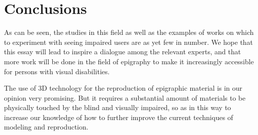 \documentclass[amsthm,ebook]{saparticle}
\begin{document}
\section{Conclusions}
\noindent As can be seen, the studies in this field as well as the examples of works on which to experiment with seeing impaired
users are as yet few in number. We hope that this essay will lead to inspire a dialogue among the relevant experts, and
that more work will be done in the field of epigraphy to make it increasingly accessible for persons with visual
disabilities.

The use of 3D technology for the reproduction of epigraphic material is in our opinion very promising. But it requires a
substantial amount of materials to be physically touched by the blind and visually impaired, so as in this way to
increase our knowledge of how to further improve the current techniques of modeling and reproduction.

\nocite{accessibilita,Bellini2000,Cetorelli2004,Hersh2008,Jansson2003,Levi2015,Velestino2007}




\end{document}
